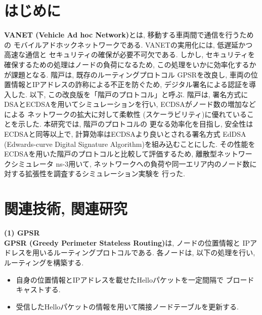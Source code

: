 \documentclass[a4j,9pt,twocolumn]{jsarticle}
\begin{document}
\pagestyle{empty} %

\section{はじめに}
\textbf{VANET (Vehicle Ad hoc Network)}とは, 移動する車両間で通信を行うための
モバイルアドホックネットワークである. VANETの実用化には, 低遅延かつ高速な通信と
セキュリティの確保が必要不可欠である. しかし, セキュリティを確保するための処理はノードの負荷になるため, 
この処理をいかに効率化するかが課題となる. 階戸\cite{shinato}は, 既存のルーティングプロトコル
GPSRを改良し, 車両の位置情報とIPアドレスの詐称による不正を防ぐため, 
デジタル署名による認証を導入した. 以下, この改良版を「階戸のプロトコル」と呼ぶ. 
階戸は, 署名方式にDSAとECDSAを用いてシミュレーションを行い, ECDSAがノード数の増加などによる
ネットワークの拡大に対して柔軟性 (スケーラビリティ)に優れていることを示した. 本研究では, 階戸のプロトコルの
更なる効率化を目指し, 安全性はECDSAと同等以上で, 計算効率はECDSAより良いとされる署名方式
EdDSA (Edwards-curve Digital Signature Algorithm)を組み込むことにした.  
その性能をECDSAを用いた階戸のプロトコルと比較して評価するため, 離散型ネットワークシミュレータ ns-3用いて, 
ネットワークへの負荷や同一エリア内のノード数に対する拡張性を調査するシミュレーション実験を
行った. 
\section{関連技術, 関連研究}
\noindent \textbf{(1) GPSR}\\
\indent \textbf{GPSR (Greedy Perimeter Stateless Routing)}は, ノードの位置情報と
IPアドレスを用いるルーティングプロトコルである. 各ノードは, 以下の処理を行い, 
ルーティングを構築する. 
\begin{itemize}
\item 自身の位置情報とIPアドレスを載せたHelloパケットを一定間隔で
ブロードキャストする.
\item 受信したHelloパケットの情報を用いて隣接ノードテーブルを更新する.
\end{itemize}
\end{document}
